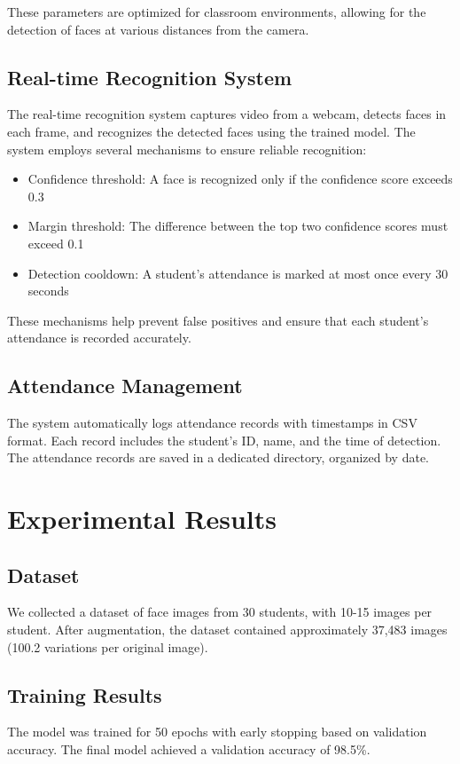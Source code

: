 \documentclass[conference]{IEEEtran}
\begin{document}
These parameters are optimized for classroom environments, allowing for the detection of faces at various distances from the camera.

\subsection{Real-time Recognition System}
The real-time recognition system captures video from a webcam, detects faces in each frame, and recognizes the detected faces using the trained model. The system employs several mechanisms to ensure reliable recognition:

\begin{itemize}
\item Confidence threshold: A face is recognized only if the confidence score exceeds 0.3
\item Margin threshold: The difference between the top two confidence scores must exceed 0.1
\item Detection cooldown: A student's attendance is marked at most once every 30 seconds
\end{itemize}

These mechanisms help prevent false positives and ensure that each student's attendance is recorded accurately.

\subsection{Attendance Management}
The system automatically logs attendance records with timestamps in CSV format. Each record includes the student's ID, name, and the time of detection. The attendance records are saved in a dedicated directory, organized by date.

\section{Experimental Results}
\subsection{Dataset}
We collected a dataset of face images from 30 students, with 10-15 images per student. After augmentation, the dataset contained approximately 37,483 images (100.2 variations per original image).

\subsection{Training Results}
The model was trained for 50 epochs with early stopping based on validation accuracy. The final model achieved a validation accuracy of 98.5\%.
\end{document}
